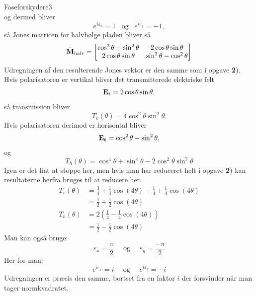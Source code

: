 \begin{opgave}{Faseforskydere}{3}
\begin{equation}
\end{equation}
og dermed bliver 
\begin{equation}
e^{i\varepsilon_x} = 1 \,\,\,\,\, \text{og} \,\,\,\,\, e^{i\varepsilon_y} = -1,
\end{equation}
så Jones matricen for halvbølge pladen bliver så 
\begin{equation}
\tilde{\mathbf{M}}_{\text{halv}} = \begin{bmatrix}
\cos^2\theta-\sin^2\theta & 2\cos\theta\sin\theta \\
2\cos\theta\sin\theta & \sin^2\theta -\cos^2\theta \\
\end{bmatrix}
\end{equation}
Udregningen af den resulterende Jones vektor er den samme som i opgave \textbf{2}).
Hvis polarisatoren er vertikal bliver det transmitterede elektriske felt 
\begin{equation}
\mathbf{E_t} = 2\cos\theta\sin\theta,
\end{equation}
så transmission bliver 
\begin{equation}
T_v(\theta) = 4\cos^2\theta\sin^2\theta.
\end{equation}
Hvis polarisatoren derimod er horisontal bliver 
\begin{equation}
\mathbf{E_t} = \cos^2\theta - \sin^2\theta, 
\end{equation}
og 
\begin{equation}
T_h(\theta) = \cos^4\theta + \sin^4\theta - 2\cos^2\theta\sin^2\theta
\end{equation}
Igen er det fint at stoppe her, men hvis man har reduceret helt i opgave \textbf{2}) kan resultaterne herfra bruges til at reducere her.
\begin{align*}
T_v(\theta) &= \frac{3}{4}+\frac{1}{4}\cos(4\theta)-\frac{1}{4}+\frac{1}{4}\cos(4\theta)
\\&=
\frac{1}{2}+\frac{1}{2}\cos(4\theta)\\
T_h(\theta) &= 2\left(\frac{1}{4}-\frac{1}{4}\cos(4\theta)\right)
\\&=
\frac{1}{2}-\frac{1}{2}\cos(4\theta)
\end{align*}
Man kan også bruge:
$$
\varepsilon_x = \frac{\pi}{2} ~~~~~~\text{og}~~~~~~\varepsilon_y = \frac{-\pi}{2}
$$
Her for man:
$$
e^{i\varepsilon_x} = i~~~~~~\text{og}~~~~~~e^{i\varepsilon_y} = -i
$$
Udregningen er præcis den samme, bortset fra en faktor $i$ der forsvinder når man tager normkvadratet.

\end{opgave}

